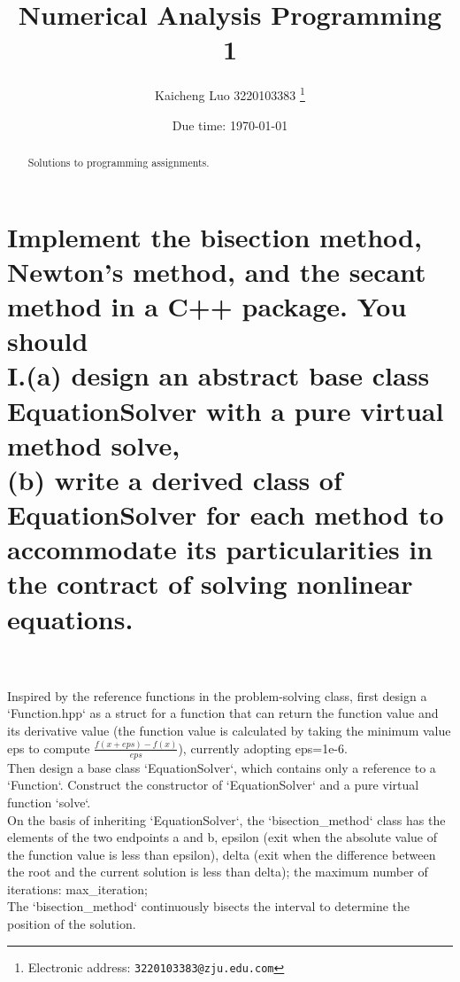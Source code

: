 \documentclass[a4paper]{article}
\begin{document}
\title{Numerical Analysis Programming 1}

\author{Kaicheng Luo 3220103383
  \thanks{Electronic address: \texttt{3220103383@zju.edu.com}}}

\date{Due time: \today}

\maketitle

\begin{abstract}
    Solutions to programming assignments.
\end{abstract}

\section*{ Implement the bisection method, Newton’s method, and the secant method in a C++ package. You should\\ 
  I.(a) design an abstract base class EquationSolver with
a pure virtual method solve,\\
(b) write a derived class of EquationSolver for each method to accommodate its particularities in the contract of solving nonlinear equations.\\}
\\
\\
Inspired by the reference functions in the problem-solving class, first design a `Function.hpp` as a struct for a function that can return the function value and its derivative value (the function value is calculated by taking the minimum value eps to compute $\frac{f(x+eps)-f(x)}{eps}$), currently adopting eps=1e-6.\\
Then design a base class `EquationSolver`, which contains only a reference to a `Function`. Construct the constructor of `EquationSolver` and a pure virtual function `solve`.\\
On the basis of inheriting `EquationSolver`, the `bisection_method` class has the elements of the two endpoints a and b, epsilon (exit when the absolute value of the function value is less than epsilon), delta (exit when the difference between the root and the current solution is less than delta); the maximum number of iterations: max_iteration;\\
The `bisection_method` continuously bisects the interval to determine the position of the solution.\\
\end{document}
